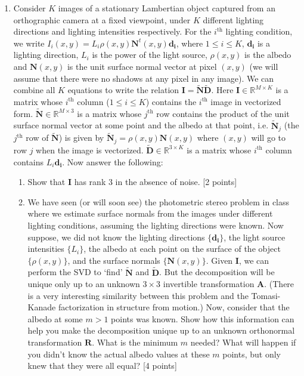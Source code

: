 \documentclass[11pt]{article}
\begin{document}
\begin{enumerate}
\item Consider $K$ images of a stationary Lambertian object captured from an orthographic camera at a fixed viewpoint, under $K$ different lighting directions and lighting intensities respectively. For the $i^{\textrm{th}}$ lighting condition, we write $I_i(x,y) = L_i \rho(x,y) \mathbf{N}^t(x,y) \mathbf{d_i}$, where $1 \leq i \leq K$, $\mathbf{d_i}$ is a lighting direction, $L_i$ is the power of the light source, $\rho(x,y)$ is the albedo and $\mathbf{N}(x,y)$ is the unit surface normal vector at pixel $(x,y)$ (we will assume that there were no shadows at any pixel in any image). We can combine all $K$ equations to write the relation $\mathbf{I} = \mathbf{\tilde{N}} \mathbf{\tilde{D}}$. Here $\mathbf{I} \in \mathbb{R}^{M \times K}$ is a matrix whose $i^{\textrm{th}}$ column ($1 \leq i \leq K$) contains the $i^{\textrm{th}}$ image in vectorized form. $\mathbf{\tilde{N}} \in \mathbb{R}^{M \times 3}$ is a matrix whose $j^{\textrm{th}}$ row contains the product of the unit surface normal vector at some point and the albedo at that point, i.e. $\mathbf{\tilde{N}}_j$ (the $j^{\textrm{th}}$ row of $\mathbf{\tilde{N}}$) is given by $\mathbf{\tilde{N}}_j = \rho(x,y) \mathbf{N}(x,y)$ where $(x,y)$ will go to row $j$ when the image is vectorized. $\mathbf{\tilde{D}} \in \mathbb{R}^{3 \times K}$ is a matrix whose $i^{\textrm{th}}$ column contains $L_i \mathbf{d_i}$. Now answer the following:
\begin{enumerate} 
\item Show that $\mathbf{I}$ has rank 3 in the absence of noise. \textsf{[2 points]}
\item We have seen (or will soon see) the photometric stereo problem in class where we estimate surface normals from the images under different lighting conditions, assuming the lighting directions were known. Now suppose, we did not know the lighting directions $\{\mathbf{d_i}\}$, the light source intensities $\{L_i\}$, the albedo at each point on the surface of the object $\{\rho(x,y)\}$, and the surface normals $\{\mathbf{N}(x,y)\}$. Given $\mathbf{I}$, we can perform the SVD to `find' $\mathbf{\tilde{N}}$ and $\mathbf{\tilde{D}}$. But the decomposition will be unique only up to an unknown $3 \times 3$ invertible transformation $\mathbf{A}$. (There is a very interesting similarity between this problem and the Tomasi-Kanade factorization in structure from motion.) Now, consider that the albedo at some $m > 1$ points was known. Show how this information can help you make the decomposition unique up to an unknown orthonormal transformation $\mathbf{R}$. What is the minimum $m$ needed? What will happen if you didn't know the actual albedo values at these $m$ points, but only knew that they were all equal? \textsf{[4 points]}

\end{enumerate}
\end{enumerate}
\end{document}
